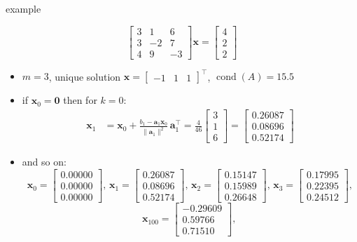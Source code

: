 \documentclass[usepdftitle=false,usenames,dvipsnames]{beamer}
\newcommand{\cond}{\operatorname{cond}}
\newcommand{\ba}{\mathbf{a}}
\newcommand{\bx}{\mathbf{x}}
\newcommand{\bzero}{\bm{0}}
\newcommand{\ds}{\displaystyle}
\begin{document}
\begin{frame}{example}

    $$\begin{bmatrix} 3 & 1 & 6 \\ 3 & -2 & 7 \\ 4 & 9 & -3 \end{bmatrix} \bx = \begin{bmatrix} 4 \\ 2 \\ 2 \end{bmatrix}$$

\begin{itemize}
\item $m=3$, unique solution $\ds \bx = \begin{bmatrix} -1 & 1 & 1 \end{bmatrix}^\top$, $\cond(A)=15.5$
\item if $\bx_0=\bzero$ then for $k=0$:
\begin{align*}
\bx_1 &= \bx_0 + \frac{b_1 - \ba_1 \bx_0}{\|\ba_1\|^2}\, \ba_1^\top = \frac{4}{46} \begin{bmatrix} 3 \\ 1 \\ 6 \end{bmatrix} =
\begin{bmatrix} 0.26087 \\ 0.08696 \\ 0.52174 \end{bmatrix}
\end{align*}
\item and so on:
{\scriptsize
$$\bx_0=\begin{bmatrix}  0.00000 \\ 0.00000 \\ 0.00000 \end{bmatrix}, \,
\bx_1=\begin{bmatrix}  0.26087 \\  0.08696 \\  0.52174 \end{bmatrix}, \,
\bx_2=\begin{bmatrix}  0.15147 \\  0.15989 \\  0.26648 \end{bmatrix}, \,
\bx_3=\begin{bmatrix}  0.17995 \\  0.22395 \\  0.24512 \end{bmatrix},$$
$$\bx_{100}=\begin{bmatrix} -0.29609  \\ 0.59766  \\ 0.71510 \end{bmatrix}, \,
$$}
\end{itemize}
\end{frame}
\end{document}
